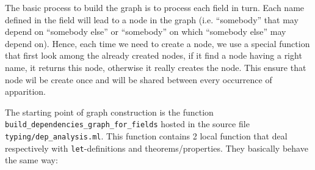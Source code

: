 The basic process to build the graph is to process each field in
turn. Each name defined in the field will lead to a node in the graph
(i.e. ``somebody'' that may depend on ``somebody else'' or
``somebody'' on which ``somebody else'' may depend on). Hence, each
time we need to create a node, we use a special function that first
look among the already created nodes, if it find a node having a right
name, it returns this node, otherwise it really creates the node. This
ensure that node wil be create once and will be shared between every
occurrence of apparition.

The starting point of graph construction is the function
{\tt build\_dependencies\_graph\_for\_fields} hosted in the source
file {\tt typing/dep\_analysis.ml}. This function contains 2 local
function that deal respectively with {\tt let}-definitions and
theorems/properties. They basically behave the same way:
